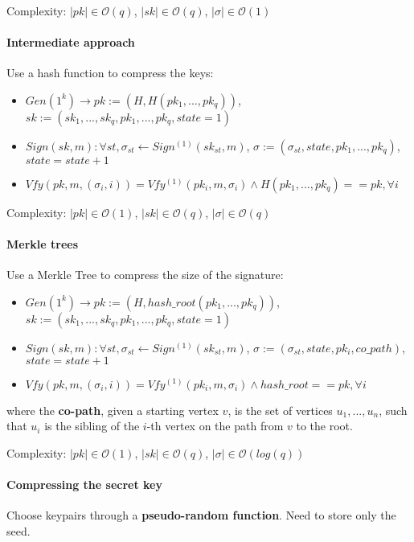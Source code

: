 \documentclass[oneside]{book}
\newcommand{\cO}[0]{\mathcal{O}}
\begin{document}
Complexity: $|pk| \in \cO(q)$, $|sk| \in \cO(q)$, $|\sigma| \in \cO(1)$

\paragraph{Intermediate approach} Use a hash function to compress the keys:
\begin{itemize}
    \item $Gen(1^k) \rightarrow pk := (H, H(pk_1, ..., pk_q))$, $sk := (sk_1, ..., sk_q, pk_1, ..., pk_q, state=1)$
    \item $Sign(sk, m): \forall st, \sigma_{st} \leftarrow Sign^{(1)}(sk_{st}, m)$, $\sigma := (\sigma_{st}, state, pk_1, ..., pk_q)$, $state = state + 1$
    \item $Vfy(pk, m, (\sigma_i, i)) = Vfy^{(1)}(pk_i, m, \sigma_i) \land H(pk_1, ..., pk_q) == pk, \forall i$
\end{itemize}

Complexity: $|pk| \in \cO(1)$, $|sk| \in \cO(q)$, $|\sigma| \in \cO(q)$

\paragraph{Merkle trees} Use a Merkle Tree to compress the size of the signature:
\begin{itemize}
    \item $Gen(1^k) \rightarrow pk := (H, hash\_root(pk_1, ..., pk_q))$, $sk := (sk_1, ..., sk_q, pk_1, ..., pk_q, state=1)$
    \item $Sign(sk, m): \forall st, \sigma_{st} \leftarrow Sign^{(1)}(sk_{st}, m)$, $\sigma := (\sigma_{st}, state, pk_i, co\_path)$, $state = state + 1$
    \item $Vfy(pk, m, (\sigma_i, i)) = Vfy^{(1)}(pk_i, m, \sigma_i) \land hash\_root == pk, \forall i$
\end{itemize}

where the \textbf{co-path}, given a starting vertex $v$, is the set of vertices $u_1, ..., u_n$, such that $u_i$ is the sibling of the $i$-th vertex on the path from $v$ to the root.

Complexity: $|pk| \in \cO(1)$, $|sk| \in \cO(q)$, $|\sigma| \in \cO(log(q))$

\paragraph{Compressing the secret key} Choose keypairs through a \textbf{pseudo-random function}. Need to store only the seed.\\
\end{document}
